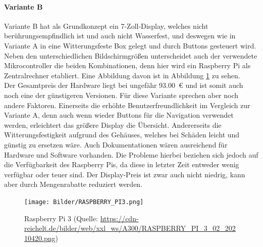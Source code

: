 \paragraph{Variante B}
Variante B hat als Grundkonzept ein 7-Zoll-Display, welches nicht berührungsempfindlich ist und auch nicht Wasserfest, und deswegen wie in Variante A in eine Witterungsfeste Box gelegt und durch Buttons gesteuert wird. Neben den unterschiedlichen Bildschirmgrößen unterscheidet auch der verwendete Mikrocontroller die beiden Kombinationen, denn hier wird ein Raspberry Pi als Zentralrechner etabliert. Eine Abbildung davon ist in Abbildung \ref{fig:raspi3} zu sehen.\\
Der Gesamtpreis der Hardware liegt bei ungefähr 93.00 € und ist somit auch noch eine der günstigeren Versionen. Für diese Variante sprechen aber noch andere Faktoren. Einerseits die erhöhte Benutzerfreundlichkeit im Vergleich zur Variante A, denn auch wenn wieder Buttons für die Navigation verwendet werden, erleichtert das größere Display die Übersicht. Andererseits die Witterungsfestigkeit aufgrund des Gehäuses, welches bei Schäden leicht und günstig zu ersetzen wäre. Auch Dokumentationen wären ausreichend für Hardware und Software vorhanden. Die Probleme hierbei beziehen sich jedoch auf die Verfügbarkeit des Raspberry Pis, da diese in letzter Zeit entweder wenig verfügbar oder teuer sind. Der Display-Preis ist zwar auch nicht niedrig, kann aber durch Mengenrabatte reduziert werden.
\begin{figure}[ht]
	\centering
	\texttt{[image: Bilder/RASPBERRY\_PI3.png]}
	\caption{Raspberry Pi 3 (Quelle: \url{https://cdn-reichelt.de/bilder/web/xxl_ws/A300/RASPBERRY_PI_3_02_20210420.png})}
	\label{fig:raspi3}
\end{figure}
